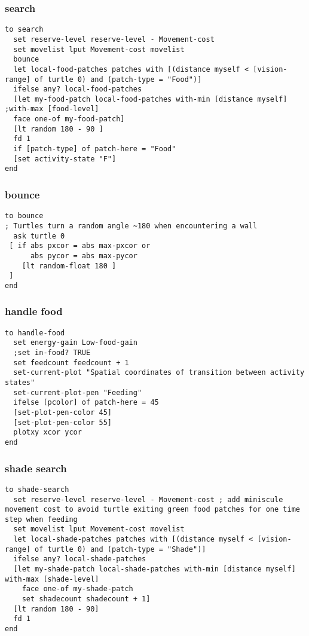 \documentclass[]{article}
\begin{document}
\subsubsection{search}\label{search}

\begin{verbatim}
to search
  set reserve-level reserve-level - Movement-cost 
  set movelist lput Movement-cost movelist
  bounce
  let local-food-patches patches with [(distance myself < [vision-range] of turtle 0) and (patch-type = "Food")]
  ifelse any? local-food-patches
  [let my-food-patch local-food-patches with-min [distance myself] ;with-max [food-level]
  face one-of my-food-patch]
  [lt random 180 - 90 ]
  fd 1
  if [patch-type] of patch-here = "Food"
  [set activity-state "F"]
end
\end{verbatim}

\subsubsection{bounce}\label{bounce}

\begin{verbatim}
to bounce
; Turtles turn a random angle ~180 when encountering a wall
  ask turtle 0
 [ if abs pxcor = abs max-pxcor or
      abs pycor = abs max-pycor
    [lt random-float 180 ]
 ]
end
\end{verbatim}

\subsubsection{handle food}\label{handle-food}

\begin{verbatim}
to handle-food
  set energy-gain Low-food-gain
  ;set in-food? TRUE
  set feedcount feedcount + 1
  set-current-plot "Spatial coordinates of transition between activity states"
  set-current-plot-pen "Feeding"
  ifelse [pcolor] of patch-here = 45
  [set-plot-pen-color 45]
  [set-plot-pen-color 55]
  plotxy xcor ycor
end
\end{verbatim}

\subsubsection{shade search}\label{shade-search}

\begin{verbatim}
to shade-search
  set reserve-level reserve-level - Movement-cost ; add miniscule movement cost to avoid turtle exiting green food patches for one time step when feeding
  set movelist lput Movement-cost movelist
  let local-shade-patches patches with [(distance myself < [vision-range] of turtle 0) and (patch-type = "Shade")]
  ifelse any? local-shade-patches
  [let my-shade-patch local-shade-patches with-min [distance myself] with-max [shade-level]
    face one-of my-shade-patch
    set shadecount shadecount + 1]
  [lt random 180 - 90]
  fd 1
end
\end{verbatim}
\end{document}
